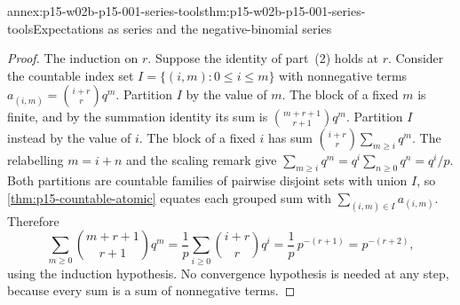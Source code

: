 \begin{annexitem}{annex:p15-w02b-p15-001-series-tools}{thm:p15-w02b-p15-001-series-tools}{Expectations as series and the negative-binomial series}
\begin{proof}
The induction on \(r\). Suppose the identity of part~(2) holds at
\(r\). Consider the countable index set
\(I=\{(i,m):0\leq i\leq m\}\) with nonnegative terms
\(a_{(i,m)}=\binom{i+r}{r}q^m\). Partition \(I\) by the value of
\(m\). The block of a fixed \(m\) is finite, and by the summation
identity its sum is \(\binom{m+r+1}{r+1}q^m\). Partition \(I\)
instead by the value of \(i\). The block of a fixed \(i\) has sum
\(\binom{i+r}{r}\sum_{m\geq i}q^m\). The relabelling \(m=i+n\) and
the scaling remark give \(\sum_{m\geq i}q^m=q^i\sum_{n\geq0}q^n=q^i/p\).
Both partitions are countable families of pairwise disjoint sets with
union \(I\), so \cref{thm:p15-countable-atomic} equates each grouped
sum with \(\sum_{(i,m)\in I}a_{(i,m)}\). Therefore
\[
 \sum_{m\geq0}\binom{m+r+1}{r+1}q^m
 =\frac1p\sum_{i\geq0}\binom{i+r}{r}q^i
 =\frac1p\,p^{-(r+1)}=p^{-(r+2)},
\]
using the induction hypothesis. No convergence hypothesis is needed at
any step, because every sum is a sum of nonnegative terms.
\end{proof}
\end{annexitem}

